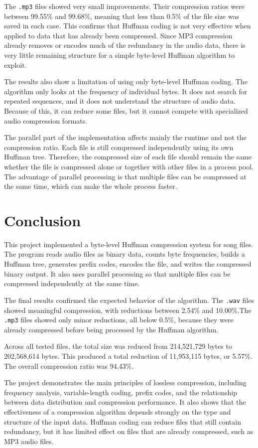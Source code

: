 \documentclass[11pt,a4paper]{article}
\begin{document}
The \texttt{.mp3} files showed very small improvements. Their compression ratios
were between 99.55\% and 99.68\%, meaning that less than 0.5\% of the file size
was saved in each case. This confirms that Huffman coding is not very effective
when applied to data that has already been compressed. Since MP3 compression
already removes or encodes much of the redundancy in the audio data, there is
very little remaining structure for a simple byte-level Huffman algorithm to
exploit.

The results also show a limitation of using only byte-level Huffman coding. The
algorithm only looks at the frequency of individual bytes. It does not search
for repeated sequences, and it does not understand the structure of audio data.
Because of this, it can reduce some files, but it cannot compete with specialized
audio compression formats.

The parallel part of the implementation affects mainly the runtime and not the
compression ratio. Each file is still compressed independently using its own
Huffman tree. Therefore, the compressed size of each file should remain the same
whether the file is compressed alone or together with other files in a process
pool. The advantage of parallel processing is that multiple files can be
compressed at the same time, which can make the whole process faster.

\section{Conclusion}

This project implemented a byte-level Huffman compression system for song files.
The program reads audio files as binary data, counts byte frequencies, builds a
Huffman tree, generates prefix codes, encodes the file, and writes the compressed
binary output. It also uses parallel processing so that multiple files can be
compressed independently at the same time.

The final results confirmed the expected behavior of the algorithm. The
\texttt{.wav} files showed meaningful compression, with reductions between
2.54\% and 10.00\%.The \texttt{.mp3} files showed only
minor reductions, all below 0.5\%, because they were already compressed before
being processed by the Huffman algorithm.

Across all tested files, the total size was reduced from 214,521,729 bytes to
202,568,614 bytes. This produced a total reduction of 11,953,115 bytes, or
5.57\%. The overall compression ratio was 94.43\%.

The project demonstrates the main principles of lossless compression, including
frequency analysis, variable-length coding, prefix codes, and the relationship
between data distribution and compression performance. It also shows that the
effectiveness of a compression algorithm depends strongly on the type and
structure of the input data. Huffman coding can reduce files that still contain
redundancy, but it has limited effect on files that are already compressed, such
as MP3 audio files.
\end{document}
